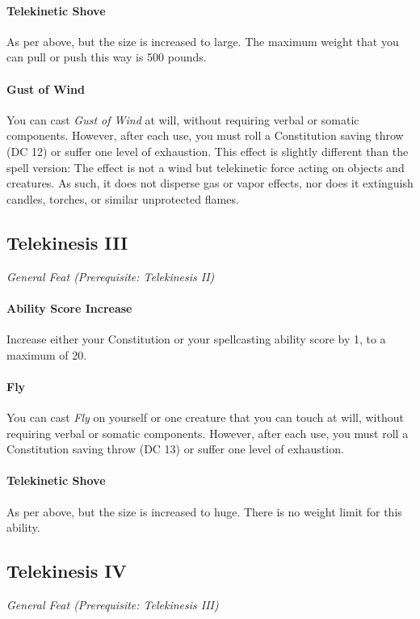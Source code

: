 \documentclass[twocolumn]{dndbook}
\begin{document}
\paragraph*{Telekinetic Shove} As per above, but the size is increased to large.
The maximum weight that you can pull or push this way is 500 pounds.
\paragraph*{Gust of Wind} You can cast \emph{Gust of Wind} at will,
without requiring verbal or somatic components. However, after each use, you must roll a Constitution saving throw (DC 12) or suffer one level of exhaustion.
This effect is slightly different than the spell version:
The effect is not a wind but telekinetic force acting on objects and creatures.
As such, it does not disperse gas or vapor effects, nor does it extinguish candles, torches, or similar unprotected flames.

\subsection{Telekinesis III}
{\emph{General Feat (Prerequisite: Telekinesis II)}}\par
\paragraph*{Ability Score Increase} Increase either your Constitution or your spellcasting ability score by 1, to a maximum of 20.
\paragraph*{Fly} You can cast \emph{Fly} on yourself or one creature that you can touch at will,
without requiring verbal or somatic components. However, after each use, you must roll a Constitution saving throw (DC 13) or suffer one level of exhaustion.
\paragraph*{Telekinetic Shove} As per above, but the size is increased to huge.
There is no weight limit for this ability.

\subsection{Telekinesis IV}
{\emph{General Feat (Prerequisite: Telekinesis III)}}\par
\end{document}
